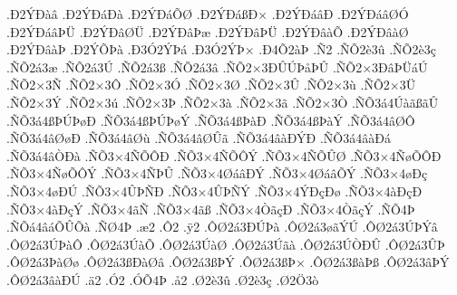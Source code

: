 {.^^d02^^dd^^d0^^e0^^e2
.^^d02^^dd^^d0^^e1^^d0^^e0
.^^d02^^dd^^d0^^e1^^d5^^d8
.^^d02^^dd^^d0^^e1^^df^^d0^^d7
.^^d02^^dd^^d0^^e1^^e2^^d0
.^^d02^^dd^^d0^^e1^^e2^^d8^^d3
.^^d02^^dd^^d0^^e1^^e2^^de^^dc
.^^d02^^dd^^d0^^e2^^d8^^dc
.^^d02^^dd^^d0^^e2^^de^^e6
.^^d02^^dd^^d0^^e2^^de^^dc
.^^d02^^dd^^d0^^e2^^e0^^d5
.^^d02^^dd^^d0^^e2^^e0^^d8
.^^d02^^dd^^d0^^e2^^e0^^de
.^^d02^^dd^^d5^^de^^e0
.^^d03^^d32^^dd^^de^^e1
.^^d03^^d32^^dd^^de^^d7
.^^d04^^d52^^e0^^de
.^^d12
.^^d1^^d52^^e83^^fb
.^^d1^^d52^^e83^^e7
.^^d1^^d52^^e13^^e6
.^^d1^^d52^^e13^^da
.^^d1^^d52^^e13^^df
.^^d1^^d52^^e13^^e2
.^^d1^^d52^^d73^^d0^^db^^da^^de^^e5^^de^^db
.^^d1^^d52^^d73^^d0^^e2^^de^^dc^^e1^^da
.^^d1^^d52^^d73^^d1
.^^d1^^d52^^d73^^d4
.^^d1^^d52^^d73^^d3
.^^d1^^d52^^d73^^d8
.^^d1^^d52^^d73^^db
.^^d1^^d52^^d73^^f9
.^^d1^^d52^^d73^^dc
.^^d1^^d52^^d73^^dd
.^^d1^^d52^^d73^^fa
.^^d1^^d52^^d73^^de
.^^d1^^d52^^d73^^e0
.^^d1^^d52^^d73^^e3
.^^d1^^d52^^d73^^d2
.^^d1^^d53^^e14^^da^^e0^^e3^^df^^e3^^db
.^^d1^^d53^^e14^^df^^de^^da^^de^^f8^^d0
.^^d1^^d53^^e14^^df^^de^^da^^de^^f8^^dd
.^^d1^^d53^^e14^^df^^de^^e0^^d0
.^^d1^^d53^^e14^^df^^de^^e0^^dd
.^^d1^^d53^^e14^^e2^^d8^^d4
.^^d1^^d53^^e14^^e2^^d8^^f8^^d0
.^^d1^^d53^^e14^^e2^^d8^^f9
.^^d1^^d53^^e14^^e2^^d8^^db^^e3
.^^d1^^d53^^e14^^e2^^e0^^d0^^dd^^d0
.^^d1^^d53^^e14^^e2^^e0^^d0^^e1
.^^d1^^d53^^e14^^e2^^d2^^d0^^e0
.^^d1^^d53^^d74^^d1^^d5^^d4^^d0
.^^d1^^d53^^d74^^d1^^d5^^d4^^dd
.^^d1^^d53^^d74^^d1^^d5^^db^^d8
.^^d1^^d53^^d74^^d1^^f8^^d5^^d4^^d0
.^^d1^^d53^^d74^^d1^^f8^^d5^^d4^^dd
.^^d1^^d53^^d74^^d1^^de^^db
.^^d1^^d53^^d74^^d8^^e1^^e2^^d0^^dd
.^^d1^^d53^^d74^^d8^^e1^^e2^^d5^^dd
.^^d1^^d53^^d74^^f8^^d0^^e7
.^^d1^^d53^^d74^^f8^^d0^^da
.^^d1^^d53^^d74^^db^^de^^d1^^d0
.^^d1^^d53^^d74^^db^^de^^d1^^dd
.^^d1^^d53^^d74^^dd^^d0^^e7^^d0^^f8
.^^d1^^d53^^d74^^e0^^d0^^e7^^d0
.^^d1^^d53^^d74^^e0^^d0^^e7^^dd
.^^d1^^d53^^d74^^e3^^d1
.^^d1^^d53^^d74^^e3^^df
.^^d1^^d53^^d74^^d2^^e3^^e7^^d0
.^^d1^^d53^^d74^^d2^^e3^^e7^^dd
.^^d1^^d54^^de
.^^d1^^d5^^e14^^e2^^e1^^d5^^db^^d5^^e0
.^^d1^^d84^^de
.^^e62
.^^d42
.^^ff2
.^^d4^^d82^^e13^^d0^^da^^de^^e0
.^^d4^^d82^^e13^^f8^^e3^^dd^^da
.^^d4^^d82^^e13^^da^^de^^dd^^e2
.^^d4^^d82^^e13^^da^^de^^e0^^d4
.^^d4^^d82^^e13^^da^^e0^^d5
.^^d4^^d82^^e13^^da^^e0^^d8
.^^d4^^d82^^e13^^da^^e3^^e0
.^^d4^^d82^^e13^^da^^d2^^d0^^db
.^^d4^^d82^^e13^^db^^de
.^^d4^^d82^^e13^^de^^e0^^d8^^f8
.^^d4^^d82^^e13^^df^^d0^^e0^^d8^^e2
.^^d4^^d82^^e13^^df^^de^^dd
.^^d4^^d82^^e13^^df^^de^^d7
.^^d4^^d82^^e13^^df^^e0^^de^^df
.^^d4^^d82^^e13^^e2^^de^^dd
.^^d4^^d82^^e13^^e2^^e0^^d0^^da
.^^e42
.^^d32
.^^d3^^d54^^de
.^^e52
.^^d82^^e83^^fb
.^^d82^^e83^^e7
.^^d82^^d63^^f2
}

